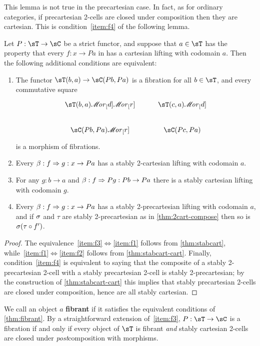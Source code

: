 \documentclass{amsart}
\let\To\Rightarrow
\def\ar#1{\mathscr{M}\!\mathit{or}_{#1}}
\begin{document}
This lemma is not true in the precartesian case.
In fact, as for ordinary categories, if precartesian 2-cells are closed under composition then they are cartesian.
This is condition~\ref{item:f4} of the following lemma.

\begin{lem}\label{thm:fibrant}
  Let $P:\sT\to\sC$ be a strict functor, and suppose that $a\in \sT$ has the property that every $f:x\to Pa$ in \sC has a cartesian lifting with codomain $a$.
  Then the following additional conditions are equivalent:
  \begin{enumerate}
  \item The functor $\sT(b,a) \to \sC(Pb,Pa)$ is a fibration for all $b\in\sT$, and every commutative square
  \[
  \begin{tikzcd}
    \sT(b,a) \ar[d] \ar[r] & \sT(c,a) \ar[d] \\
    \sC(Pb,Pa) \ar[r] & \sC(Pc,Pa)
  \end{tikzcd}
  \]
  is a morphism of fibrations.\label{item:f3}
  \item Every $\be : f\To g : x\to Pa$ has a stably 2-cartesian lifting with codomain $a$.\label{item:f1}
  \item For any $g:b\to a$ and $\be : f\To Pg : Pb \to Pa$ there is a stably cartesian lifting with codomain $g$.\label{item:f2}
  \item Every $\be : f\To g : x\to Pa$ has a stably 2-precartesian lifting with codomain $a$, and if $\sigma$ and $\tau$ are stably 2-precartesian as in \cref{thm:2cart-compose} then so is $\sigma (\tau\circ f')$.\label{item:f4}
  \end{enumerate}
\end{lem}
\begin{proof}
  The equivalence~\ref{item:f3}$\Leftrightarrow$\ref{item:f1} follows from \cref{thm:stabcart}, while~\ref{item:f1}$\Leftrightarrow$\ref{item:f2} follows from \cref{thm:stabcart-cart}.
  Finally, condition~\ref{item:f4} is equivalent to saying that the composite of a stably 2-precartesian 2-cell with a stably precartesian 2-cell is stably 2-precartesian; by the construction of \cref{thm:stabcart-cart} this implies that stably precartesian 2-cells are closed under composition, hence are all stably cartesian.
\end{proof}

We call an object $a$ \textbf{fibrant} if it satisfies the equivalent conditions of \cref{thm:fibrant}.
By a straightforward extension of~\ref{item:f3}, $P:\sT\to\sC$ is a fibration if and only if every object of $\sT$ is fibrant \emph{and} stably cartesian 2-cells are closed under \emph{post}composition with morphisms.
\end{document}
